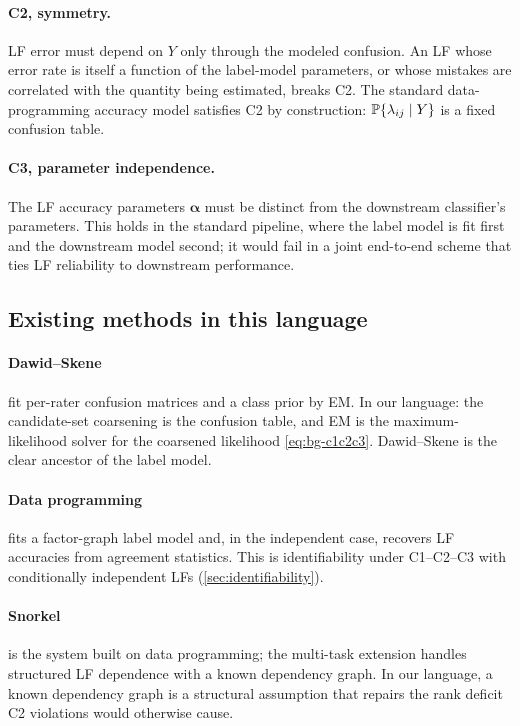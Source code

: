 \paragraph{C2, symmetry.} LF error must depend on $Y$ only through
the modeled confusion. An LF whose error rate is itself a function of
the label-model parameters, or whose mistakes are correlated with the
quantity being estimated, breaks C2. The standard data-programming
accuracy model satisfies C2 by construction: $\mathbb{P}\{\lambda_{ij}
\mid Y\}$ is a fixed confusion table.

\paragraph{C3, parameter independence.} The LF accuracy parameters
$\bm{\alpha}$ must be distinct from the downstream classifier's
parameters. This holds in the standard pipeline, where the label
model is fit first and the downstream model second; it would fail in
a joint end-to-end scheme that ties LF reliability to downstream
performance.

\subsection{Existing methods in this language}

\paragraph{Dawid--Skene \citep{dawid1979maximum}} fit per-rater
confusion matrices and a class prior by EM. In our language: the
candidate-set coarsening is the confusion table, and EM is the
maximum-likelihood solver for the coarsened likelihood
\eqref{eq:bg-c1c2c3}. Dawid--Skene is the clear ancestor of the
label model.

\paragraph{Data programming \citep{ratner2016data}} fits a
factor-graph label model and, in the independent case, recovers LF
accuracies from agreement statistics. This is identifiability under
C1--C2--C3 with conditionally independent LFs (\cref{sec:identifiability}).

\paragraph{Snorkel \citep{ratner2017snorkel}} is the system built on
data programming; the multi-task extension \citep{ratner2019training}
handles structured LF dependence with a known dependency graph. In
our language, a known dependency graph is a structural assumption
that repairs the rank deficit C2 violations would otherwise cause.

